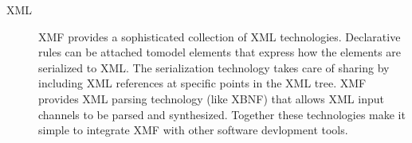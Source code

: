 \documentclass{article}
\begin{document}
\begin{description}
\item[XML]
XMF provides a sophisticated collection of XML technologies. Declarative rules can 
be attached tomodel elements that express how the elements are serialized to XML.
The serialization technology takes care of sharing by including XML references at
specific points in the XML tree. XMF provides XML parsing technology (like XBNF)
that allows XML input channels to be parsed and synthesized. Together these technologies
make it simple to integrate XMF with other software devlopment tools.

\end{description}
\end{document}
